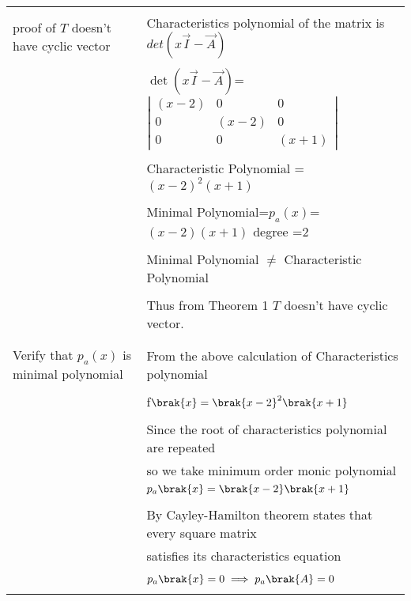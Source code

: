 \begin{longtable}{|l|l|}
\hline

\multirow{3}{*}{proof of $T$ doesn't have cyclic vector } & \\
&
Characteristics polynomial of the matrix  is $det(x\vec{I}-\vec{A})$\\ 
&\\
& $\det(x\vec{I}-\vec{A})$= $\left|
                \begin{array}{ccc}
                (x-2) & 0 & 0\\
                0 & (x-2) & 0\\
                0 & 0 & (x+1)
                \end{array} \right|$  \\
&\\
& Characteristic Polynomial = $(x-2)^2(x+1)$\\
&\\
& Minimal Polynomial=$p_a(x)$=$(x-2)(x+1)$  degree =2   \\
&\\
&Minimal Polynomial $\neq$ Characteristic Polynomial \\
&\\
&Thus from Theorem 1 $T$ doesn't have cyclic vector.\\  
&\\
\hline
\multirow{3}{*}{Verify that $p_a(x)$ is minimal polynomial} & \\
&From the above calculation of Characteristics polynomial\\
&\\
&f$\brak{x}=\brak{x-2}^2\brak{x+1}$\\
&\\
&Since the root of characteristics polynomial are repeated\\
&so we take minimum order monic polynomial\\
&$p_a\brak{x}=\brak{x-2}\brak{x+1}$\\
&\\

& By Cayley-Hamilton theorem states that every square matrix  \\
&satisfies its characteristics equation\\
&\\
&$p_a\brak{x}=0 \implies p_a\brak{A}=0$\\
&\\


\end{longtable}
